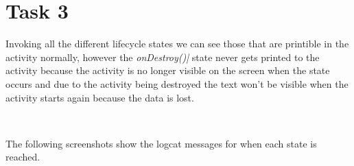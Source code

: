 \documentclass[11pt,english,numbers=endperiod,parskip=half]{scrartcl}
\begin{document}
\section{Task 3}
\raggedright
Invoking all the different lifecycle states we can see those that are printible in the activity normally, however the \textit{onDestroy()|} state never gets printed to the activity because the activity is no longer visible on the screen when the state occurs and due to the activity being destroyed the text won't be visible when the activity starts again because the data is lost.

\\
\bigskip

The following screenshots show the logcat messages for when each state is reached.
\bigskip
{}\\
\bigskip
{}\\
\bigskip
\end{document}
